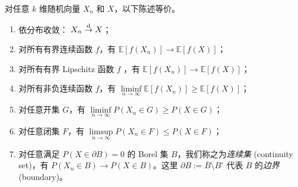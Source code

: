 \begin{theorem}[Portmanteau 定理]\label{thm:ch1:portmanteau}

\label{thm:ch1:1-1}

对任意 $k$ 维随机向量 $X_n$ 和 $X$，以下陈述等价。

\begin{enumerate}
\def\labelenumi{\arabic{enumi}.}
\tightlist
\item
  依分布收敛： $X_n \overset{\rm d}\to X$；
\item
  对所有有界连续函数 $f$，有 $\mathbb{E}[f(X_n)] \to \mathbb{E}[f(X)]$；
\item
  对所有有界 Lipschitz 函数 $f$ ，有 $\mathbb{E}[f(X_n)] \to \mathbb{E}[f(X)]$；
\item
  对所有非负连续函数 $f$，有 $\liminf\limits_{n\to\infty} \mathbb{E}[f(X_n)] \geq \mathbb{E}[f(X) ]$；
\item
  对任意开集 $G$，有 $\liminf\limits_{n\to\infty} P(X_n \in G) \geq P(X \in G)$；
\item
  对任意闭集 $F$，有 $\limsup\limits_{n\to\infty} P(X_n \in F) \leq P(X \in F)$；
\item
  对任意满足 $P(X \in \partial B) = 0$ 的 Borel 集 $B$，我们称之为\emph{连续集} (continuity set)，有 $P(X_n \in B) \to P(X \in B)$。这里 $\partial B:=\overline B\setminus B^\circ$ 代表 $B$ 的\emph{边界} (boundary)。
\end{enumerate}

\end{theorem}

